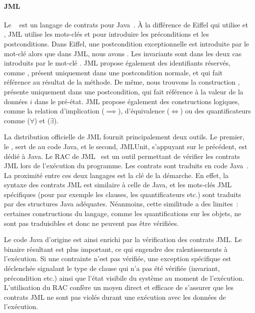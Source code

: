 \paragraph{JML} Le ~ est un langage
de contrats pour Java~. À la différence de Eiffel qui utilise
 et , JML utilise les mots-clés  et
 pour introduire les préconditions et les postconditions. Dans
Eiffel, une postcondition exceptionnelle est introduite par le mot-clé
 alors que dans JML, nous avons . Les invariants sont
dans les deux cas introduits par le mot-clé . JML propose
également des identifiants réservés, comme \aresult, présent uniquement dans une
postcondition normale, et qui fait référence au résultat de la méthode.  De
même, nous trouvons la construction , présente uniquement dans une
postcondition, qui fait référence à la valeur de la données $i$ dans le
pré-état. JML propose également des constructions logiques, comme la relation
d'implication ($\implies$), d'équivalence ($\Longleftrightarrow$) ou des
quantificateurs comme  ($\forall$) et
 ($\exists$).

La distribution officielle de JML fournit principalement deux outils.  Le
premier, le , sert de
 au code Java, et le second, JMLUnit, s'appuyant sur le
précédent, est dédié à Java. Le RAC de JML~ est un outil
permettant de vérifier les contrats JML lors de l'exécution du programme. Les
contrats sont traduits en code Java~. La proximité entre ces
deux langages est la clé de la démarche. En effet, la syntaxe des contrats JML
est similaire à celle de Java, et les mots-clés JML spécifiques (pour par
exemple les clauses, les quantificateurs etc.) sont traduits par des structures
Java adéquates. Néanmoins, cette similitude a des limites~: certaines
constructions du langage, comme les quantifications sur les objets, ne sont pas
traduisibles et donc ne peuvent pas être vérifiées.

Le code Java d'origine est ainsi enrichi par la vérification des contrats JML.
Le binaire résultant est plus important, ce qui engendre des ralentissements à
l'exécution. Si une contrainte n'est pas vérifiée, une exception spécifique est
déclenchée signalant le type de clause qui n'a pas été vérifiée (invariant,
précondition etc.) ainsi que l'état visibile du système au moment de
l'exécution.  L'utilisation du RAC confère un moyen direct et efficace de
s'assurer que les contrats JML ne sont pas violés durant une exécution avec les
données de l'exécution.

